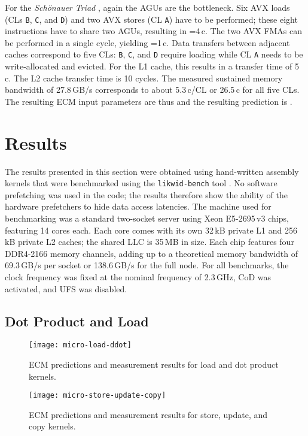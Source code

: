 \documentclass{llncs}
\newcommand{\ecm}[6]{\mbox{}}
\newcommand{\ecmp}[5]{\mbox{}}
\begin{document}
For the \textit{Sch\"onauer Triad} \cite{schoenauer:00}, again the AGUs are the
bottleneck. Six AVX loads (CLs \texttt{B}, \texttt{C}, and \texttt{D}) and two
AVX stores (CL \texttt{A}) have to be performed; these eight instructions have
to share two AGUs, resulting in =4\,c. The two AVX FMAs can be
performed in a single cycle, yielding =1\,c.  Data transfers
between adjacent caches correspond to five CLs: \texttt{B}, \texttt{C}, and
\texttt{D} require loading while CL \texttt{A} needs to be write-allocated and
evicted. For the L1 cache, this results in a transfer time of 5\,c. The L2
cache transfer time is 10 cycles. The measured sustained memory bandwidth of
27.8\,GB/s corresponds to about 5.3\,c/CL or 26.5\,c for all five CLs.  The
resulting ECM input parameters are thus \ecm{1}{4}{5}{10}{26.5}{\mathrm{c}} and
the resulting prediction is \ecmp{4}{9}{19}{45.5}{\mathrm{c}}.


\section{Results}
\label{sec:results}

The results presented in this section were obtained using hand-written assembly
kernels that were benchmarked using the \texttt{likwid-bench} tool
\cite{Treibig:2011:3}.  No software prefetching was used in the code; the
results therefore show the ability of the hardware prefetchers to hide data
access latencies. The machine used for benchmarking was a standard two-socket
server using Xeon E5-2695\,v3 chips, featuring 14 cores each. Each core comes
with its own 32\,kB private L1 and 256\,kB private L2 caches; the shared
\ac{LLC} is 35\,MB in size. Each chip features four DDR4-2166 memory channels,
adding up to a theoretical memory bandwidth of 69.3\,GB/s per socket or
138.6\,GB/s for the full node.  For all benchmarks, the clock frequency was
fixed at the nominal frequency of 2.3\,GHz, \ac{CoD} was activated, and
\ac{UFS} was disabled.


\subsection{Dot Product and Load}


\begin{figure}[tb]
\begin{minipage}{.49\textwidth}
    \centering
    \texttt{[image: micro-load-ddot]}
    \caption{ECM predictions and measurement results for load and dot product kernels.}
    \label{fig:micro-loadddot}
\end{minipage}\hfill
\begin{minipage}{.49\textwidth}
    \centering
    \texttt{[image: micro-store-update-copy]}
    \caption{ECM predictions and measurement results for store, update, and copy kernels.}
    \label{fig:micro-stupco}
\end{minipage}
\end{figure}
\end{document}
